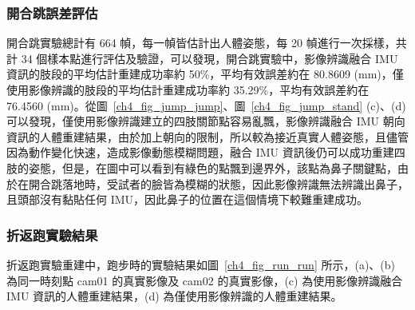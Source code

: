 \subsubsection*{開合跳誤差評估}
開合跳實驗總計有 664 幀，每一幀皆估計出人體姿態，每 20 幀進行一次採樣，共計 34 個樣本點進行評估及驗證，可以發現，開合跳實驗中，影像辨識融合 IMU 資訊的肢段的平均估計重建成功率約 50\%，平均有效誤差約在 80.8609 (mm)，僅使用影像辨識的肢段的平均估計重建成功率約 35.29\%，平均有效誤差約在 76.4560 (mm)。從圖~\ref{ch4_fig_jump_jump}、圖~\ref{ch4_fig_jump_stand} (c)、(d) 可以發現，僅使用影像辨識建立的四肢關節點容易亂飄，影像辨識融合 IMU 朝向資訊的人體重建結果，由於加上朝向的限制，所以較為接近真實人體姿態，且儘管因為動作變化快速，造成影像動態模糊問題，融合 IMU 資訊後仍可以成功重建四肢的姿態，但是，在圖中可以看到有綠色的點飄到邊界外，該點為鼻子關鍵點，由於在開合跳落地時，受試者的臉皆為模糊的狀態，因此影像辨識無法辨識出鼻子，且頭部沒有黏貼任何 IMU，因此鼻子的位置在這個情境下較難重建成功。

\clearpage

\subsubsection*{折返跑實驗結果}
折返跑實驗重建中，跑步時的實驗結果如圖~\ref{ch4_fig_run_run} 所示，(a)、(b) 為同一時刻點 cam01 的真實影像及 cam02 的真實影像，(c) 為使用影像辨識融合 IMU 資訊的人體重建結果，(d) 為僅使用影像辨識的人體重建結果。


